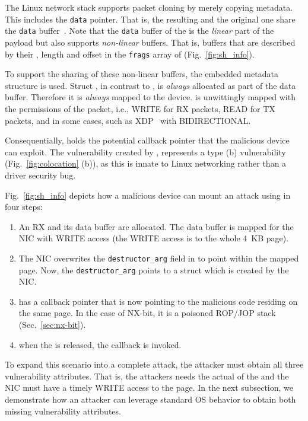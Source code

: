 The Linux network stack supports packet cloning by merely copying \skb{} metadata. This includes the \texttt{data} pointer. That is, the resulting \skb{} and the original one share the \texttt{data} buffer~\cite{drivers2005linux}. Note that the \texttt{data} buffer of the \skb{} is the \emph{linear} part of the payload but \skb{} also supports \emph{non-linear} buffers. That is, buffers that are described by their \page{}, length and offset in the \texttt{frags} array of \shinfo{} (Fig.~\ref{fig:sh_info}). 

To support the sharing of these non-linear buffers, the embedded \shinfo{} metadata structure is used.
Struct \shinfo{}, in contrast to \skb{}, is \emph{always} allocated as part of the data buffer. Therefore it is \emph{always} mapped to the device. \shinfo{} is unwittingly mapped with the permissions of the packet, i.e., WRITE for RX packets, READ for TX packets, and in some cases, such as XDP~\cite{xdp} with BIDIRECTIONAL.

Consequentially, \shinfo{} holds the potential callback pointer that the malicious device can exploit. The \subpage{} vulnerability created by \shinfo{}, represents a type (b) vulnerability (Fig.~\ref{fig:colocation} (b)), as this is innate to Linux networking rather than a driver security bug. 

Fig.~\ref{fig:sh_info} depicts how a malicious device can mount an attack using \shinfo{} in four steps:
\begin{enumerate}[label=(\alph*)]
    \item An RX \skb{} and its data buffer are allocated. The data buffer is mapped for the NIC with WRITE access (the WRITE access is to the whole 4~KB page). 
    \item The NIC overwrites the \texttt{destructor\_arg} field in \shinfo{} to point within the mapped page. Now, the \texttt{destructor\_arg} points to a struct \uarg{} which is created by the NIC.
    \item \uarg{} has a callback pointer that is now pointing to the malicious code residing on the same page. In the case of NX-bit, it is a poisoned ROP/JOP\cite{BJFL11} stack (Sec.~\ref{sec:nx-bit}).
    \item when the \skb{} is released, the callback is invoked.
\end{enumerate}
To expand this scenario into a complete attack, the attacker must obtain all three vulnerability attributes. That is, the attackers needs the actual \kva{} of the \mabaf{} and the NIC must have a timely WRITE access to the page. In the next subsection, we demonstrate how an attacker can leverage standard OS behavior to obtain both missing vulnerability attributes.

